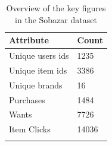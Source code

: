     \begin{table}[H]
        \centering
        \begin{tabular}{l l}
            \toprule
            Attribute       & Count   \\ \midrule
            Unique users ids   & 1235           \\
            Unique item ids    & 3386           \\
            Unique brands      & 16             \\
            Purchases          & 1484           \\
            Wants              & 7726           \\
            Item Clicks        & 14036          \\
            \bottomrule
        \caption[Dataset summary]{Overview of the key figures in the Sobazar dataset}
        \label{table:datasetSummary}
        \end{tabular}
    \end{table}



